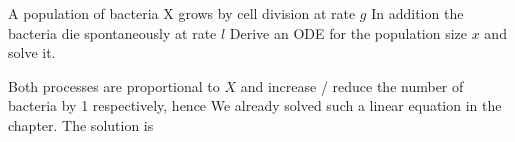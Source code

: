 
A population of bacteria X grows by cell division at rate $g$
In addition the bacteria die spontaneously at rate $l$
Derive an ODE for the population size $x$ and solve it. 

\solution
Both processes are proportional to $X$ and increase / reduce the number of bacteria by 1 respectively, hence
We already solved such a linear equation in the chapter. The solution is 
